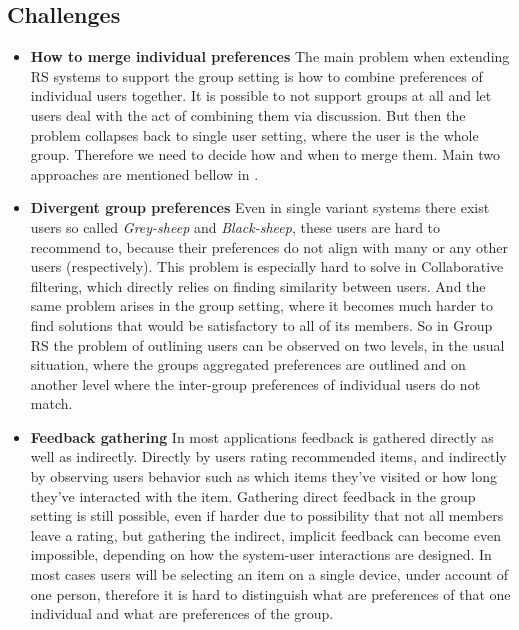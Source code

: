 \subsection{Challenges}\label{subsec:01_group_rec_sys.challenges}
\begin{itemize}
    \item \textbf{How to merge individual preferences} \newline
        The main problem when extending RS systems to support the group setting is how to combine preferences of individual users together. It is possible to not support groups at all and let users deal with the act of combining them via discussion. But then the problem collapses back to single user setting, where the user is the whole group. Therefore we need to decide how and when to merge them. Main two approaches are mentioned bellow in .
    \item \textbf{Divergent group preferences} \newline
        Even in single variant systems there exist users so called \textit{Grey-sheep} and \textit{Black-sheep}, these users are hard to recommend to, because their preferences do not align with many or any other users (respectively). This problem is especially hard to solve in Collaborative filtering, which directly relies on finding similarity between users. And the same problem arises in the group setting, where it becomes much harder to find solutions that would be satisfactory to all of its members. So in Group RS the problem of outlining users can be observed on two levels, in the usual situation, where the groups aggregated preferences are outlined and on another level where the inter-group preferences of individual users do not match.
    \item \textbf{Feedback gathering} \newline
        In most applications feedback is gathered directly as well as indirectly. Directly by users rating recommended items, and indirectly by observing users behavior such as which items they've visited or how long they've interacted with the item. Gathering direct feedback in the group setting is still possible, even if harder due to possibility that not all members leave a rating, but gathering the indirect, implicit feedback can become even impossible, depending on how the system-user interactions are designed. In most cases users will be selecting an item on a single device, under account of one person, therefore it is hard to distinguish what are preferences of that one individual and what are preferences of the group.

\end{itemize}
